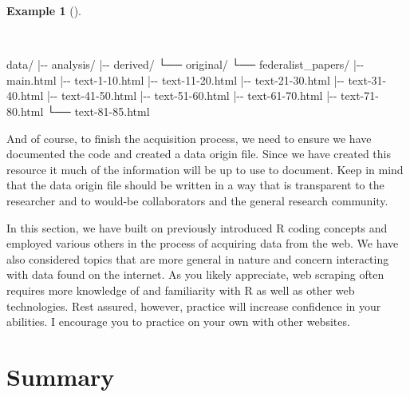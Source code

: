 \documentclass[
  letterpaper,
  DIV=11,
  numbers=noendperiod]{scrreport}
\newenvironment{Shaded}{\begin{snugshade}}{\end{snugshade}}
\newcommand{\ExtensionTok}[1]{\textcolor[rgb]{0.00,0.00,0.00}{#1}}
\newcommand{\KeywordTok}[1]{\textcolor[rgb]{0.00,0.00,0.00}{#1}}
\newcommand{\NormalTok}[1]{\textcolor[rgb]{0.00,0.00,0.00}{#1}}
\theoremstyle{definition}
\newtheorem{example}{Example}[chapter]
\theoremstyle{remark}
\begin{document}
\begin{example}[]\protect\hypertarget{exm-ad-fed-papers-directory}{}\label{exm-ad-fed-papers-directory}

~

\begin{Shaded}
\begin{Highlighting}[]
\ExtensionTok{data/}
\KeywordTok{|}\ExtensionTok{{-}{-}}\NormalTok{ analysis/}
\KeywordTok{|}\ExtensionTok{{-}{-}}\NormalTok{ derived/}
\ExtensionTok{└──}\NormalTok{ original/}
    \ExtensionTok{└──}\NormalTok{ federalist\_papers/}
        \KeywordTok{|}\ExtensionTok{{-}{-}}\NormalTok{ main.html}
        \KeywordTok{|}\ExtensionTok{{-}{-}}\NormalTok{ text{-}1{-}10.html}
        \KeywordTok{|}\ExtensionTok{{-}{-}}\NormalTok{ text{-}11{-}20.html}
        \KeywordTok{|}\ExtensionTok{{-}{-}}\NormalTok{ text{-}21{-}30.html}
        \KeywordTok{|}\ExtensionTok{{-}{-}}\NormalTok{ text{-}31{-}40.html}
        \KeywordTok{|}\ExtensionTok{{-}{-}}\NormalTok{ text{-}41{-}50.html}
        \KeywordTok{|}\ExtensionTok{{-}{-}}\NormalTok{ text{-}51{-}60.html}
        \KeywordTok{|}\ExtensionTok{{-}{-}}\NormalTok{ text{-}61{-}70.html}
        \KeywordTok{|}\ExtensionTok{{-}{-}}\NormalTok{ text{-}71{-}80.html}
        \ExtensionTok{└──}\NormalTok{ text{-}81{-}85.html}
\end{Highlighting}
\end{Shaded}

\end{example}

And of course, to finish the acquisition process, we need to ensure we
have documented the code and created a data origin file. Since we have
created this resource it much of the information will be up to use to
document. Keep in mind that the data origin file should be written in a
way that is transparent to the researcher and to would-be collaborators
and the general research community.

In this section, we have built on previously introduced R coding
concepts and employed various others in the process of acquiring data
from the web. We have also considered topics that are more general in
nature and concern interacting with data found on the internet. As you
likely appreciate, web scraping often requires more knowledge of and
familiarity with R as well as other web technologies. Rest assured,
however, practice will increase confidence in your abilities. I
encourage you to practice on your own with other websites.

\hypertarget{summary-4}{%
\section*{Summary}\label{summary-4}}
\end{document}
